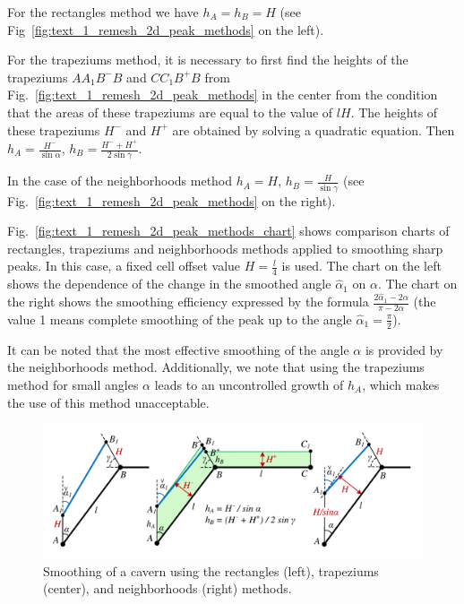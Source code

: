 \documentclass[
11pt,%
tightenlines,%
twoside,%
onecolumn,%
nofloats,%
nobibnotes,%
nofootinbib,%
superscriptaddress,%
noshowpacs,%
centertags]%
{revtex4}
\begin{document}
For the rectangles method we have $h_A = h_B = H$ (see Fig~\ref{fig:text_1_remesh_2d_peak_methods} on the left).

For the trapeziums method, it is necessary to first find the heights of the trapeziums $AA_1B^{-}B$ and $CC_1B^{+}B$ from Fig.~\ref{fig:text_1_remesh_2d_peak_methods} in the center from the condition that the areas of these trapeziums are equal to the value of $lH$.
The heights of these trapeziums $H^{-}$ and $H^{+}$ are obtained by solving a quadratic equation.
Then $h_A = \frac{H^{-}}{\sin \alpha}$, $h_B = \frac{H^{-} + H^{+}}{2 \sin \gamma}$.

In the case of the neighborhoods method $h_A = H$, $h_B = \frac{H}{\sin \gamma}$ (see Fig.~\ref{fig:text_1_remesh_2d_peak_methods} on the right).

Fig.~\ref{fig:text_1_remesh_2d_peak_methods_chart} shows comparison charts of rectangles, trapeziums and neighborhoods methods applied to smoothing sharp peaks.
In this case, a fixed cell offset value $H = \frac{l}{4}$ is used.
The chart on the left shows the dependence of the change in the smoothed angle $\hat{\alpha}_1$ on $\alpha$.
The chart on the right shows the smoothing efficiency expressed by the formula $\frac{2 \hat{\alpha}_1 - 2 \alpha}{\pi - 2 \alpha}$ (the value 1 means complete smoothing of the peak up to the angle $\hat{\alpha}_1 = \frac{\pi}{2}$).

It can be noted that the most effective smoothing of the angle $\alpha$ is provided by the neighborhoods method.
Additionally, we note that using the trapeziums method for small angles $\alpha$ leads to an uncontrolled growth of $h_A$, which makes the use of this method unacceptable.

\begin{figure}[ht]
\setcaptionmargin{5mm}
\onelinecaptionsfalse %
\includegraphics[width=1.0\textwidth]{./pics/cavern-methods.pdf}
\caption{Smoothing of a cavern using the rectangles (left), trapeziums (center), and neighborhoods (right) methods.}
\label{fig:text_1_remesh_2d_cavern_methods}
\end{figure}
\end{document}
